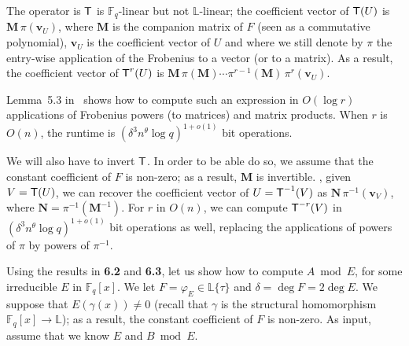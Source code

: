 \documentclass[sigconf]{acmart}
\newcommand{\F}{\mathbb{F}}
\renewcommand{\L}{\mathbb{L}}
\newcommand{\ang}[1]{\{#1\}}
\begin{document}
The operator is $\text{\sf T}$ is $\F_q$-linear but not $\L$-linear;
the coefficient vector of $\text{\sf T}(U)$ is ${\bm M}\, \pi({\bm
  v}_U)$, where ${\bm M}$ is the companion matrix of $F$ (seen as a
commutative polynomial), ${\bm v}_U$ is the coefficient vector of $U$
and where we still denote by $\pi$ the entry-wise application of the
Frobenius to a vector (or to a matrix). As a result, the coefficient
vector of $\text{\sf T}^r(U)$ is ${\bm M}\, \pi({\bm M}) \cdots
\pi^{r-1}({\bm M})\, \pi^r({\bm v}_U)$.

Lemma~5.3 in~\cite{vonzurGathen1992} shows how to compute such
an expression in $O(\log r)$ applications of Frobenius powers (to
matrices) and matrix products. When $r$ is $O(n)$, the runtime is
$(\delta^3 n^\theta \log q)^{1+o(1)}$ bit operations.

\smallskip{} We will also have to invert $\text{\sf
  T}$.  In order to be able do so, we assume that the constant
coefficient of $F$ is non-zero; as a result, ${\bm M}$ is invertible.
, given $V=\text{\sf T}(U)$, we can recover the coefficient vector
of $U=\text{\sf T}^{-1}(V)$ as ${\bm N}\, \pi^{-1}({\bm v}_V)$, where
${\bm N}=\pi^{-1}({\bm M}^{-1})$. For $r$ in $O(n)$, we can compute
$\text{\sf T}^{-r}(V)$ in $(\delta^3 n^\theta \log q)^{1+o(1)}$ bit
operations as well, replacing the applications of powers of $\pi$ by
powers of $\pi^{-1}$.

\smallskip{} Using the results in {\bf 6.2} and {\bf
  6.3}, let us show how to compute $A \bmod E$, for some irreducible
$E$ in $\F_q[x]$. We let $F=\varphi_E \in \L\ang{\tau}$ and $\delta =
\deg F = 2 \deg E$. We suppose that $E(\gamma(x)) \ne 0$ (recall that
$\gamma$ is the structural homomorphism $\F_q[x] \to \L$); as a
result, the constant coefficient of $F$ is non-zero. As input,
assume that we know $E$ and $B \bmod E$.
\end{document}
